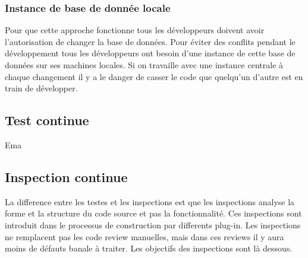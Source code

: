 

\subsubsection{Instance de base de donnée locale}

Pour que cette approche fonctionne tous les développeurs doivent avoir l'autorisation de changer la base de données. Pour éviter des conflits pendant le développement tous les développeurs ont besoin d'une instance de cette base de données sur ses machines locales. Si on travaille avec une instance centrale à chaque changement il y a le danger de casser le code que quelqu'un d'autre est en train de développer.

\subsection{Test continue}

Ema

\subsection{Inspection continue}

La difference entre les testes et les inspections est que les inspections analyse la forme et la structure du code source et pas la fonctionnalité. Ces inspections sont introduit dans le processus de construction par differents plug-in. Les inspections ne remplacent pas les code review manuelles, mais dans ces reviews il y aura moins de défauts banale à traiter. Les objectifs des inspections sont là dessous.

